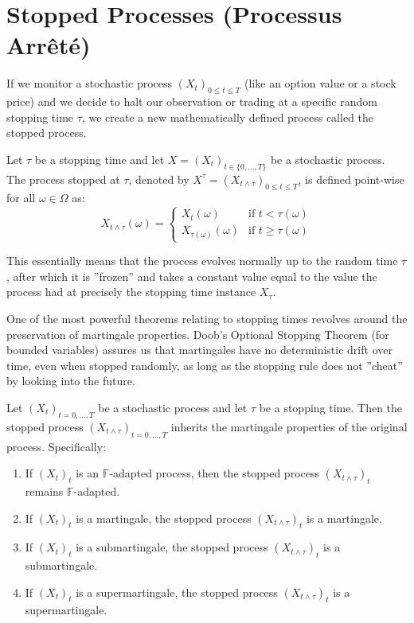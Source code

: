 \section{Stopped Processes (Processus Arrêté)}

If we monitor a stochastic process $(X_t)_{0 \leq t \leq T}$ (like an option value or a stock price) and we decide to halt our observation or trading at a specific random stopping time $\tau$, we create a new mathematically defined process called the stopped process.

\begin{definition}
Let $\tau$ be a stopping time and let $X = (X_t)_{t \in \{0, \dots, T\}}$ be a stochastic process. The process stopped at $\tau$, denoted by $X^\tau = (X_{t \wedge \tau})_{0 \leq t \leq T}$, is defined point-wise for all $\omega \in \Omega$ as:
$$
X_{t \wedge \tau}(\omega) =
\begin{cases}
X_t(\omega) & \text{if } t < \tau(\omega) \\
X_{\tau(\omega)}(\omega) & \text{if } t \geq \tau(\omega)
\end{cases}
$$
\end{definition}
This essentially means that the process evolves normally up to the random time $\tau$, after which it is ''frozen'' and takes a constant value equal to the value the process had at precisely the stopping time instance $X_\tau$.

One of the most powerful theorems relating to stopping times revolves around the preservation of martingale properties. Doob's Optional Stopping Theorem (for bounded variables) assures us that martingales have no deterministic drift over time, even when stopped randomly, as long as the stopping rule does not ''cheat'' by looking into the future.

\begin{proposition}
Let $(X_t)_{t=0, \dots, T}$ be a stochastic process and let $\tau$ be a stopping time. Then the stopped process $(X_{t \wedge \tau})_{t=0, \dots, T}$ inherits the martingale properties of the original process. Specifically:
\begin{enumerate}[label=(\alph*)]
    \item If $(X_t)_t$ is an $\mathbb{F}$-adapted process, then the stopped process $(X_{t \wedge \tau})_t$ remains $\mathbb{F}$-adapted.
    \item If $(X_t)_t$ is a martingale, the stopped process $(X_{t \wedge \tau})_t$ is a martingale.
    \item If $(X_t)_t$ is a submartingale, the stopped process $(X_{t \wedge \tau})_t$ is a submartingale.
    \item If $(X_t)_t$ is a supermartingale, the stopped process $(X_{t \wedge \tau})_t$ is a supermartingale.
\end{enumerate}
\end{proposition}

